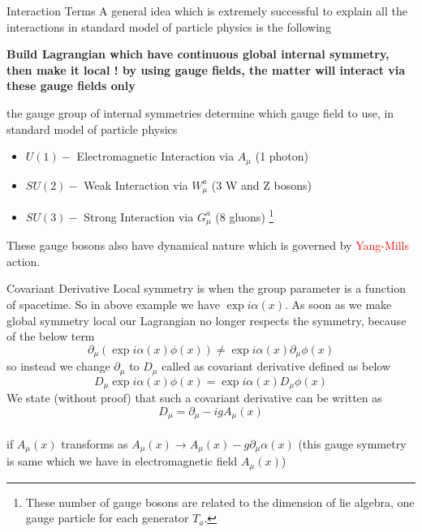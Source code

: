 \documentclass{beamer}
\begin{document}
\begin{frame}{Interaction Terms}
    A general idea which is extremely successful to explain all the interactions in standard model of particle physics is the following \\
    \begin{center}
        \textbf{Build Lagrangian which have continuous global internal symmetry, then make it local ! by using gauge fields, the matter will interact via these gauge fields only}
    \end{center} the gauge group of internal symmetries determine which gauge field to use, in standard model of particle physics
    \begin{itemize}
        \item $U(1) - $ Electromagnetic Interaction via $A_{\mu}$ (1 photon)
        \item $SU(2) - $ Weak Interaction via $W^{a}_{\mu}$ (3 W and Z bosons)
        \item $SU(3) - $ Strong Interaction via $G^{a}_{\mu}$ (8 gluons) \footnote{These number of gauge bosons are related to the dimension of lie algebra, one gauge particle for each generator $T_{a}$.}
    \end{itemize}
    These gauge bosons also have dynamical nature which is governed by \textcolor{red}{Yang-Mills} action.
\end{frame}
\begin{frame}{Covariant Derivative}
    Local symmetry is when the group parameter is a function of spacetime. So in above example we have $\exp{i\alpha(x)}$. As soon as we make global symmetry local our Lagrangian no longer respects the symmetry, because of the below term
    \begin{equation}
        \partial_{\mu}(\exp{i\alpha(x)}\phi(x)) \neq \exp{i\alpha(x)}\partial_{\mu}\phi(x)
    \end{equation} so instead we change $\partial_{\mu}$ to $D_{\mu}$ called as covariant derivative defined as below
    \begin{equation}
        D_{\mu}\exp{i\alpha(x)}\phi(x) = \exp{i\alpha(x)}D_{\mu}\phi(x)
    \end{equation} We state (without proof) that such a covariant derivative can be written as
    \begin{equation}
        D_{\mu} = \partial_{\mu} - igA_{\mu}(x)
    \end{equation} \\
    if $A_{\mu}(x)$ transforms as $A_{\mu}(x)\to A_{\mu}(x) - g\partial_{\mu}\alpha(x)$ (this gauge symmetry is same which we have in electromagnetic field $A_{\mu}(x)$)
\end{frame}
\end{document}

